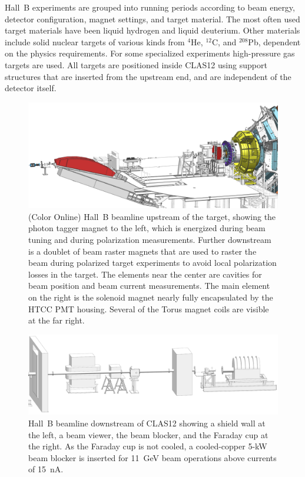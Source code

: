\documentclass[final,3p,twocolumn]{elsarticle}
\begin{document}
Hall~B experiments are grouped into running periods according to beam energy, detector configuration, magnet
settings, and target material. The most often used target materials have been liquid hydrogen and liquid deuterium.
Other materials include solid nuclear targets of various kinds from $^4$He, $^{12}$C, and $^{208}$Pb, dependent on
the physics requirements. For some specialized experiments high-pressure gas targets are used. All targets are 
positioned inside CLAS12 using support structures that are inserted from
the upstream end, and are independent of the detector itself. 
\begin{figure}[htbp!]
\centerline{\includegraphics[width=2.0\columnwidth]{beamline-1.png}}
\caption{(Color Online) Hall~B beamline upstream of the target, showing the photon tagger magnet to the left, which is energized
during beam tuning and during polarization measurements. Further downstream is a doublet of beam raster magnets
that are used to raster the beam during polarized target experiments to avoid local polarization losses in the target.
The elements near the center are cavities for beam position and beam current measurements. The main element 
on the right is the solenoid magnet nearly fully encapsulated by the HTCC PMT housing. Several of the Torus magnet
coils are visible at the far right.}
\label{beamline-upstream}
\end{figure}

\begin{figure}[htbp!]
\centerline{\includegraphics[width=2.0\columnwidth]{beamline-3.png}}
\caption{Hall~B beamline downstream of CLAS12 showing a shield wall at the left, a beam viewer, the beam blocker,
and the Faraday cup at the right. As the Faraday cup is not cooled, a cooled-copper 5-kW beam blocker is inserted
for 11~GeV beam operations above currents of 15~nA.}
\label{beamline-downstream}
\end{figure}
\end{document}
